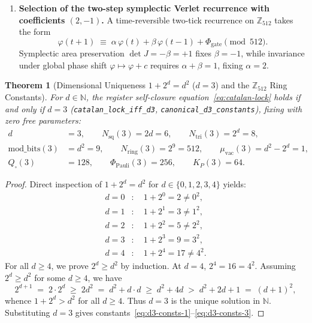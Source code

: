 \documentclass[11pt,a4paper]{article}
\theoremstyle{plain}
\newtheorem{theorem}{Theorem}[section]
\theoremstyle{definition}
\begin{document}
\begin{enumerate}[label=\textbf{Step \arabic*.},leftmargin=*]
\item \textbf{Selection of the two-step symplectic Verlet recurrence with coefficients $(2,-1)$.}
  A time-reversible two-tick recurrence on $\mathbb{Z}_{512}$ takes the form
  \begin{equation}
    \label{eq:general-two-step}
    \varphi(t+1) \;\equiv\; \alpha\,\varphi(t) + \beta\,\varphi(t-1) + \Phi_{\mathrm{gate}} \pmod{512}.
  \end{equation}
  Symplectic area preservation $\det J = -\beta = +1$ fixes $\beta = -1$, while invariance under global phase shift $\varphi \mapsto \varphi + c$ requires $\alpha + \beta = 1$, fixing $\alpha = 2$.
\end{enumerate}

\begin{theorem}[Dimensional Uniqueness $1 + 2^d = d^2$ ($d = 3$) and the $\mathbb{Z}_{512}$ Ring Constants]
\label{thm:d3-uniqueness}
For $d\in\mathbb{N}$, the register self-closure equation~\eqref{eq:catalan-lock} holds if and only if $d = 3$ (\texttt{catalan\_lock\_iff\_d3}, \texttt{canonical\_d3\_constants}), fixing with zero free parameters:
\begin{align}
  d &= 3, \qquad N_{\mathrm{sq}}(3) = 2d = 6, \qquad N_{\mathrm{tri}}(3) = 2^d = 8, \label{eq:d3-consts-1} \\
  \mathrm{mod\_bits}(3) &= d^2 = 9, \qquad N_{\mathrm{ring}}(3) = 2^9 = 512, \qquad \mu_{\mathrm{vac}}(3) = d^2 - 2^d = 1, \label{eq:d3-consts-2} \\
  Q_\square(3) &= 128, \qquad \Phi_{\mathrm{Pauli}}(3) = 256, \qquad K_P(3) = 64. \label{eq:d3-consts-3}
\end{align}
\end{theorem}

\begin{proof}
Direct inspection of $1 + 2^d = d^2$ for $d \in \{0, 1, 2, 3, 4\}$ yields:
\begin{align*}
  d = 0 &: \quad 1 + 2^0 = 2 \ne 0^2, \\
  d = 1 &: \quad 1 + 2^1 = 3 \ne 1^2, \\
  d = 2 &: \quad 1 + 2^2 = 5 \ne 2^2, \\
  d = 3 &: \quad 1 + 2^3 = 9 = 3^2, \\
  d = 4 &: \quad 1 + 2^4 = 17 \ne 4^2.
\end{align*}
For all $d \ge 4$, we prove $2^d \ge d^2$ by induction. At $d = 4$, $2^4 = 16 = 4^2$. Assuming $2^d \ge d^2$ for some $d \ge 4$, we have
\begin{equation*}
  2^{d+1} \;=\; 2\cdot 2^d \;\ge\; 2d^2 \;=\; d^2 + d\cdot d \;\ge\; d^2 + 4d \;>\; d^2 + 2d + 1 \;=\; (d + 1)^2,
\end{equation*}
whence $1 + 2^d > d^2$ for all $d \ge 4$. Thus $d = 3$ is the unique solution in $\mathbb{N}$. Substituting $d = 3$ gives constants~\eqref{eq:d3-consts-1}--\eqref{eq:d3-consts-3}.
\end{proof}
\end{document}

